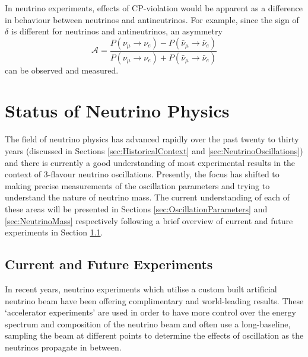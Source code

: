 In neutrino experiments, effects of CP-violation would be apparent as a difference in behaviour between neutrinos and antineutrinos.  For example, since the sign of $\delta$ is different for neutrinos and antineutrinos, an asymmetry
\begin{equation}
  \mathcal{A} = \frac{P(\nu_{\mu}\rightarrow\nu_e)-P(\bar{\nu}_{\mu}\rightarrow\bar{\nu}_e)}{P(\nu_{\mu}\rightarrow\nu_e)+P(\bar{\nu}_{\mu}\rightarrow\bar{\nu}_e)}
\end{equation}
can be observed and measured.

\section{Status of Neutrino Physics}\label{sec:NeutrinoPhysicsStatus}

The field of neutrino physics has advanced rapidly over the past twenty to thirty years (discussed in Sections \ref{sec:HistoricalContext} and \ref{sec:NeutrinoOscillations}) and there is currently a good understanding of most experimental results in the context of 3-flavour neutrino oscillations.  Presently, the focus has shifted to making precise measurements of the oscillation parameters and trying to understand the nature of neutrino mass.  The current understanding of each of these areas will be presented in Sections \ref{sec:OscillationParameters} and \ref{sec:NeutrinoMass} respectively following a brief overview of current and future experiments in Section \ref{sec:CurrentExperiments}.

\subsection{Current and Future Experiments}\label{sec:CurrentExperiments}

In recent years, neutrino experiments which utilise a custom built artificial neutrino beam have been offering complimentary and world-leading results.  These `accelerator experiments' are used in order to have more control over the energy spectrum and composition of the neutrino beam and often use a long-baseline, sampling the beam at different points to determine the effects of oscillation as the neutrinos propagate in between.

